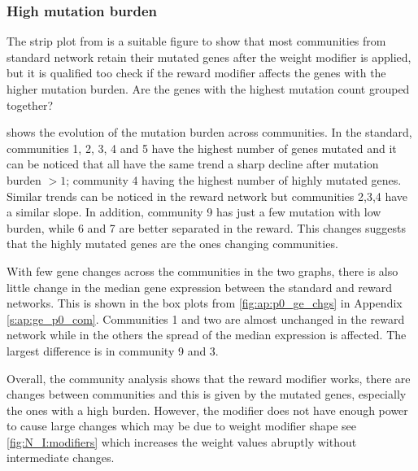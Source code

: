 \subsubsection*{High mutation burden}

The strip plot from  is a suitable figure to show that most communities from standard network retain their mutated genes after the weight modifier is applied, but it is qualified too check if the reward modifier affects the genes with the higher mutation burden. Are the genes with the highest mutation count grouped together?

 shows the evolution of the mutation burden across communities. In the standard, communities 1, 2, 3, 4 and 5 have the highest number of genes mutated and it can be noticed that all have the same trend a sharp decline after mutation burden $>1$; community 4 having the highest number of highly mutated genes. Similar trends can be noticed in the reward network but communities 2,3,4 have a similar slope. In addition, community 9 has just a few mutation with low burden, while 6 and 7 are better separated in the reward. This changes suggests that the highly mutated genes are the ones changing communities.

With few gene changes across the communities in the two graphs, there is also little change in the median gene expression between the standard and reward networks. This is shown in the box plots from \cref{fig:ap:p0_ge_chgs} in Appendix \cref{s:ap:ge_p0_com}. Communities 1 and two are almost unchanged in the reward network while in the others the spread of the median expression is affected. The largest difference is in community 9 and 3.  

Overall, the community analysis shows that the reward modifier works, there are changes between communities and this is given by the mutated genes, especially the ones with a high burden. However, the modifier does not have enough power to cause large changes which may be due to weight modifier shape see \cref{fig:N_I:modifiers} which increases the weight values abruptly without intermediate changes.

